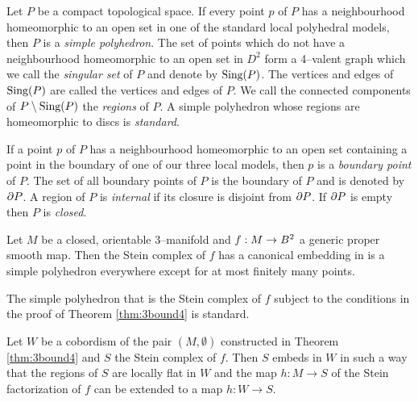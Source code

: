 												\begin{defn}
													Let $P$ be a compact topological space.	
													If every point $p$ of $P$ has a neighbourhood homeomorphic to an open set in one of the standard local polyhedral models, then $P$ is a \emph{simple polyhedron}.
													The set of points which do not have a neighbourhood homeomorphic to an open set in $D^2$ form a 4--valent graph which we call the \emph{singular set} of $P$ and denote by $\textrm{Sing} (P)$.
													The vertices and edges of $\textrm{Sing} (P)$ are called the vertices and edges of $P$.
													We call the connected components of $P\setminus\textrm{Sing} (P)$ the \emph{regions} of $P$.
													A simple polyhedron whose regions are homeomorphic to discs is \emph{standard}.
													
													If a point $p$ of $P$ has a neighbourhood homeomorphic to an open set containing a point in the boundary of one of our three local models, then $p$ is a \emph{boundary point} of $P$.
													The set of all boundary points of $P$ is the boundary of $P$ and is denoted by $\partial P$.
													A region of $P$ is \emph{internal} if its closure is disjoint from $\partial P$.
													If $\partial P$ is empty then $P$ is \emph{closed}.
												\end{defn}
												
												\begin{theorem}
													Let $M$ be a closed, orientable 3--manifold and $f:M\to B^2$ a generic proper smooth map.
													Then the Stein complex of $f$ has a canonical embedding in  is a simple polyhedron everywhere except for at most finitely many points.
												\end{theorem}
												
												
												
												\begin{lem}
													The simple polyhedron that is the Stein complex of $f$ subject to the conditions in the proof of Theorem \ref{thm:3bound4} is standard.
												\end{lem}
												
												
												\begin{theorem}	
													Let $W$ be a cobordism of the pair $(M,\emptyset)$ constructed in Theorem \ref{thm:3bound4} and $S$ the Stein complex of $f$.
													Then $S$ embeds in $W$ in such a way that the regions of $S$ are locally flat in $W$ and the map $h:M\to S$ of the Stein factorization of $f$ can be extended to a map $h:W\to S$.
												\end{theorem}
												

